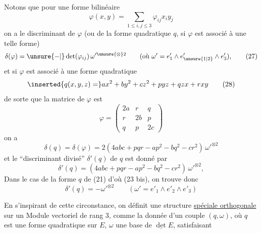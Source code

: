 Notons que pour une forme bilinéaire
\[
 \varphi(x,y)=\sum_{1\leq i,j\leq3}\varphi_{ij}x_i y_j
\]
on a le discriminant de $\varphi$ (ou de la forme quadratique $q$, si $\varphi$ est associé à une telle forme)
\[
 \delta(\varphi)=\unsure{-|}\det(\varphi_{ij})\,\omega'^{\unsure{\otimes}2}
 \qquad(\text{où }\omega'=e'_1\wedge e'_{\unsure{1|2}}\wedge e'_3), \tag*{(27)}
\]
et si $\varphi$ est associé à une forme quadratique
\[
 \inserted{q(x,y,z)=}ax^2+by^2+cz^2+pyz+qzx+rxy \tag*{(28)}
\]
de sorte que la matrice de $\varphi$ est
\[
 \varphi=\begin{pmatrix}2a&r&q\\r&2b&p\\q&p&2c\end{pmatrix} \tag*{(29)}
\]
on a
\[
 \delta(q)=\delta(\varphi)=2(4abc+pqr-ap^2-bq^2-cr^2)\,\omega'^{\otimes2} \tag*{(30)}
\]
et le ``discriminant divisé'' $\delta'(q)$ de $q$ est donné par
\[
 \delta'(q)=(4abc+pqr-ap^2-bq^2-cr^2)\,\omega'^{\otimes2}, \tag*{(31)}
\]
 Dans le cas de la forme $q$ de (21) d'où (23 bis), on trouve donc
\[
 \delta'(q)=-\omega'^{\otimes2}\qquad(\omega'=e'_1\wedge e'_2\wedge e'_3) \tag*{(32)}
\]

En s'inspirant de cette circonstance, on définit une structure \uline{spéciale orthogonale} sur un Module  vectoriel de rang 3, comme la donnée d'un couple $(q,\omega)$, où $q$ est une forme quadratique sur $E$, $\omega$ une base de $\underline{\det} E$, satisfaisant

